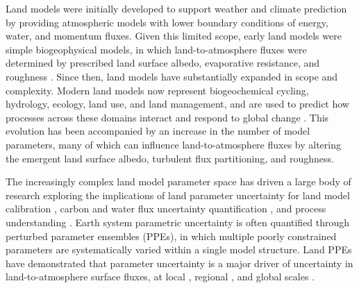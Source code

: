 \documentclass[draft]{agujournal2019}
\begin{document}
Land models were initially developed to support weather and climate prediction by providing atmospheric models with lower boundary conditions of energy, water, and momentum fluxes. Given this limited scope, early land models were simple biogeophysical models, in which land-to-atmosphere fluxes were determined by prescribed land surface albedo, evaporative resistance, and roughness \citep{manabe_climate_1969}. Since then, land models have substantially expanded in scope and complexity. Modern land models now represent biogeochemical cycling, hydrology, ecology, land use, and land management, and are used to predict how processes across these domains interact and respond to global change \citep{fisher_perspectives_2020}. This evolution has been accompanied by an increase in the number of model parameters, many of which can influence land-to-atmosphere fluxes by altering the emergent land surface albedo, turbulent flux partitioning, and roughness.

The increasingly complex land model parameter space has driven a large body of research exploring the implications of land parameter uncertainty for land model calibration \citep{dagon_machine_2020}, carbon and water flux uncertainty quantification \citep{hou_sensitivity_2012,mcneall_constraining_2023}, and process understanding \citep{boulton_exploring_2017}. Earth system parametric uncertainty is often quantified through perturbed parameter ensembles (PPEs), in which multiple poorly constrained parameters are systematically varied within a single model structure. Land PPEs have demonstrated that parameter uncertainty is a major driver of uncertainty in land-to-atmosphere surface fluxes, at local \citep{ricciuto_impact_2018,fisher_parametric_2019}, regional \citep{bauerle_carbon_2014,huo_parameter_2019}, and global scales \citep{dagon_machine_2020,zaehle_effects_2005}.

\end{document}

